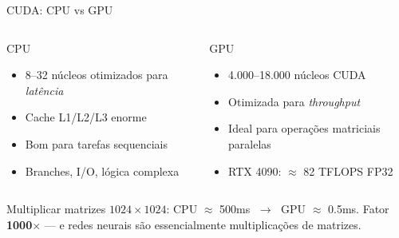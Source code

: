 \documentclass[aspectratio=169, 10pt]{beamer}
\begin{document}

\begin{frame}{CUDA: CPU vs GPU}
\begin{columns}
  \begin{block}{CPU}
    \begin{itemize}
      \item 8--32 núcleos otimizados para \textit{latência}
      \item Cache L1/L2/L3 enorme
      \item Bom para tarefas sequenciais
      \item Branches, I/O, lógica complexa
    \end{itemize}
  \end{block}

  \begin{alertblock}{GPU}
    \begin{itemize}
      \item 4.000--18.000 núcleos CUDA
      \item Otimizada para \textit{throughput}
      \item Ideal para operações matriciais paralelas
      \item RTX 4090: $\approx$ 82 TFLOPS FP32
    \end{itemize}
  \end{alertblock}
\end{columns}

\vspace{0.6em}
\begin{destaque}
  Multiplicar matrizes $1024 \times 1024$: CPU $\approx$ 500ms $\;\longrightarrow\;$ GPU $\approx$ 0.5ms. 
  Fator \textbf{1000$\times$} — e redes neurais são essencialmente multiplicações de matrizes.
\end{destaque}
\end{frame}

\end{document}
